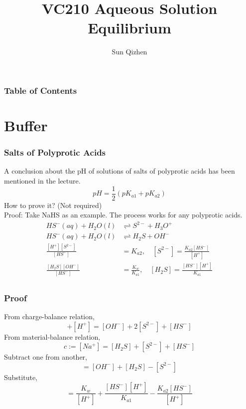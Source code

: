 \documentclass[aspectratio=169]{beamer}
\title[Course number]{VC210 Aqueous Solution Equilibrium}
\author[]{Sun Qizhen}
\institute[UMJI-SJTU]
{
	University of Michigan - Shanghai Jiaotong University
	\\\medskip
	Joint Institute
}
\begin{document}
\maketitle
\begin{frame}
  \frametitle{Table of Contents}
  \tableofcontents
\end{frame}


\section{Buffer}
\begin{frame}
  \frametitle{Salts of Polyprotic Acids}
  A conclusion about the pH of solutions of salts of polyprotic acids has been mentioned in the lecture.
  \begin{equation*}
    pH = \frac{1}{2}(pK_{a1} + pK_{a2})
  \end{equation*}
  How to prove it? (Not required) \\
  \pause
  Proof: Take NaHS as an example. The process works for any polyprotic acids. 
  \begin{equation*}
    \begin{aligned}
      HS^-(aq) + H_2O(l) &\rightleftharpoons S^{2-} + H_3O^+\\
      HS^-(aq) + H_2O(l) &\rightleftharpoons H_2S + OH^- \\
      \frac{[H^+][S^{2-}]}{[HS^-]} & = K_{a2}, \quad [S^{2-}] = \frac{K_{a2}[HS^-]}{[H^+]} \\
      \frac{[H_2S][OH^-]}{[HS^-]} & = \frac{K_w}{K_{a1}}, \quad [H_2S] = \frac{[HS^-][H^+]}{K_{a1}} \\ 
    \end{aligned}
  \end{equation*}
\end{frame}
\begin{frame}
  \frametitle{Proof}
  From charge-balance relation, 
  \begin{equation*}
    [Na^+] + [H^+] = [OH^-] + 2[S^{2-}] + [HS^-] 
  \end{equation*}
  From material-balance relation, 
  \begin{equation*}
    c := [Na^+] = [H_2S] + [S^{2-}] + [HS^-]
  \end{equation*}
  Subtract one from another, 
  \begin{equation*}
    [H^+] = [OH^-] + [H_2S] - [S^{2-}]
  \end{equation*}
  Substitute, 
  \begin{equation*}
    [H^+] = \frac{K_w}{[H^+]} + \frac{[HS^-][H^+]}{K_{a1}} - \frac{K_{a2}[HS^-]}{[H^+]}
  \end{equation*}
\end{frame}
\end{document}
